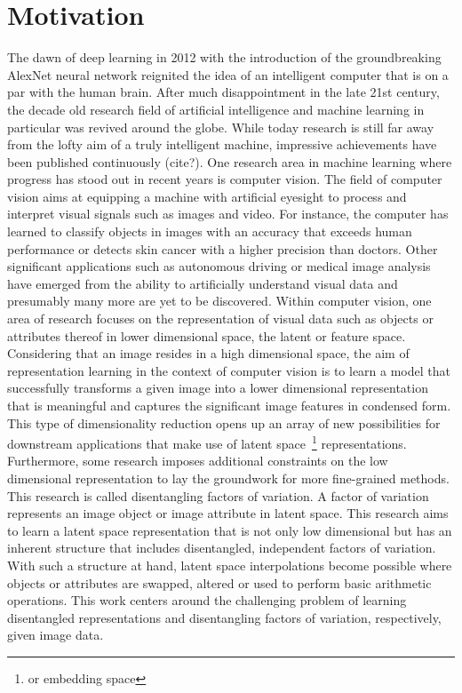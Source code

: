 \documentclass[12pt,a4paper]{article}
\begin{document}
\section{Motivation}
The dawn of deep learning in 2012 with the introduction of the groundbreaking AlexNet neural network reignited the idea of an intelligent computer that is on a par with the human brain. After much disappointment in the late 21st century, the decade old research field of artificial intelligence and machine learning in particular was revived around the globe. While today research is still far away from the lofty aim of a truly intelligent machine, impressive achievements have been published continuously (cite?). One research area in machine learning where progress has stood out in recent years is computer vision. The field of computer vision aims at equipping a machine with artificial eyesight to process and interpret visual signals such as images and video. For instance, the computer has learned to classify objects in images with an accuracy that exceeds human performance or detects skin cancer with a higher precision than doctors. Other significant applications such as autonomous driving or medical image analysis have emerged from the ability to artificially understand visual data and presumably many more are yet to be discovered. Within computer vision, one area of research focuses on the representation of visual data such as objects or attributes thereof in lower dimensional space, the latent or feature space. Considering that an image resides in a high dimensional space, the aim of representation learning in the context of computer vision is to learn a model that successfully transforms a given image into a lower dimensional representation that is meaningful and captures the significant image features in condensed form. This type of dimensionality reduction opens up an array of new possibilities for downstream applications that make use of latent space~\footnote{or embedding space} representations. Furthermore, some research imposes additional constraints on the low dimensional representation to lay the groundwork for more fine-grained methods. This research is called disentangling factors of variation. A factor of variation represents an image object or image attribute in latent space. This research aims to learn a latent space representation that is not only low dimensional but has an inherent structure that includes disentangled, independent factors of variation. With such a structure at hand, latent space interpolations become possible where objects or attributes are swapped, altered or used to perform basic arithmetic operations. This work centers around the challenging problem of learning disentangled representations and disentangling factors of variation, respectively, given image data.
\end{document}
